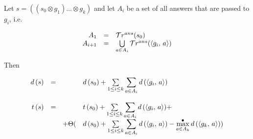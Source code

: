 \begin{lemma}
\label{lem:times_gen_measure_approximations}

Let $s = ((s_0 \otimes g_1) \dots \otimes g_k)$ and let $A_i$ be a set of all answers that are passed to $g_i$, i.e.

\[
\begin{array}{rcl}
A_1 &=& \mathcal{T}r^{ans}(s_0) \\
A_{i + 1} & = & \bigcup\limits_{a \in A_i} \mathcal{T}r^{ans}(\langle g_i ,\, a \rangle) 
\end{array}
\]

Then

\[
\begin{array}{rcrl}
d\,(s) &=& & d\,(s_0) + \sum\limits_{1 \le i \le k} \displaystyle\sum\limits_{a \in A_i} d\,(\langle g_i ,\, a \rangle) \\
\\
t\,(s) &=& & t\,(s_0) + \sum\limits_{1 \le i \le k} \displaystyle\sum\limits_{a \in A_i} d\,(\langle g_i ,\, a \rangle) + \\
& & + \Theta( & d\,(s_0) + \sum\limits_{1 \le i \le k} \displaystyle\sum\limits_{a \in A_i} d\,(\langle g_i ,\, a \rangle) - \max^{\bullet}\limits_{a \in A_k}  d\,(\langle g_k ,\, a \rangle)) \\
\end{array}
\]

\end{lemma}

